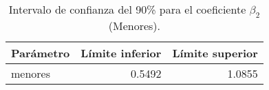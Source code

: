 \begin{table}[H]
    \centering
    \color{blue}
    \caption{Intervalo de confianza del 90\% para el coeficiente $\beta_2$ (Menores).}
    \label{tab:ci_beta2}
    \begin{tabular}{lrr}
        \toprule
        Parámetro & Límite inferior & Límite superior \\
        \midrule
        menores & 0.5492 & 1.0855 \\
        \bottomrule
    \end{tabular}
\end{table}
